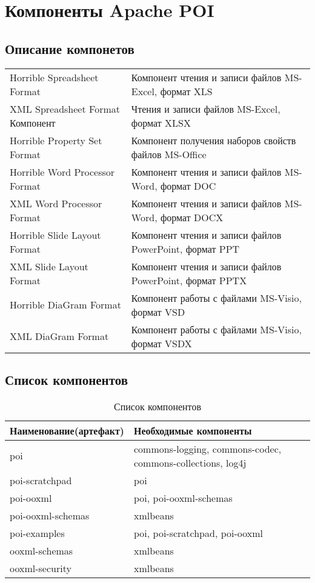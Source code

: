 \chapter{Компоненты Apache POI}
\label{chapter1}

\section{Описание компонетов}

\begin{center}
	\begin{tabular}{ll}
	Horrible Spreadsheet Format & Компонент чтения и записи файлов MS-Excel, формат XLS \\
	XML Spreadsheet Format Компонент & Чтения и записи файлов MS-Excel, формат XLSX \\
	Horrible Property Set Format & Компонент получения наборов свойств файлов MS-Office \\
	Horrible Word Processor Format & Компонент чтения и записи файлов MS-Word, формат DOC \\
	XML Word Processor Format & Компонент чтения и записи файлов MS-Word, формат DOCX \\
	Horrible Slide Layout Format & Компонент чтения и записи файлов PowerPoint, формат PPT \\
	XML Slide Layout Format & Компонент чтения и записи файлов PowerPoint, формат PPTX \\
	Horrible DiaGram Format & Компонент работы с файлами MS-Visio, формат VSD \\
	XML DiaGram Format & Компонент работы с файлами MS-Visio, формат VSDX \\
	\end{tabular}
\end{center}



\section{Список компонентов}

\begin{table}[h!]
	\begin{center}
		\caption{Список компонентов\cite{OffDoc}}
		\label{tab:listOfComponents}
		\begin{tabular}{l|l}
			\textbf{Наименование(артефакт)} & \textbf{Необходимые компоненты} \\
			\hline
			poi & commons-logging, commons-codec, commons-collections, log4j \\
			poi-scratchpad & 	poi \\
			poi-ooxml & poi, poi-ooxml-schemas \\ 
			poi-ooxml-schemas & xmlbeans \\
			poi-examples & 	poi, poi-scratchpad, poi-ooxml \\
			ooxml-schemas & 	xmlbeans  \\
		    ooxml-security & xmlbeans \\
		\end{tabular}
	\end{center}
\end{table}

